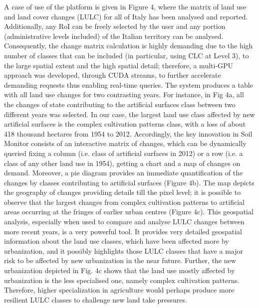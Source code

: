 \documentclass[APA,LATO1COL,doublespace]{WileyNJD-v2}
\begin{document}
A case of use of the platform is given in Figure 4, where the matrix of land use and land cover changes (LULC) for all of Italy has been analysed and reported. Additionally, any RoI can be freely selected by the user and any portion (administrative levels included) of the Italian territory can be analysed. Consequently, the change matrix calculation is highly demanding due to the high number of classes that can be included (in particular, using CLC at Level 3), to the large spatial extent and the high spatial detail; therefore, a multi-GPU approach was developed, through CUDA streams, to further accelerate demanding requests thus enabling real-time queries. The system produces a table with all land use changes for two contrasting years. For instance, in Fig 4a, all the changes of state contributing to the artificial surfaces class between two different years was selected. In our case, the largest land use class affected by new artificial surfaces is the complex cultivation patterns class, with a loss of about 418 thousand hectares from 1954 to 2012. Accordingly, the key innovation in Soil Monitor consists of an interactive matrix of changes, which can be dynamically queried fixing a column (i.e. class of artificial surfaces in 2012) or a row (i.e. a class of any other land use in 1954), getting a chart and a map of changes on demand. Moreover, a pie diagram provides an immediate quantification of the changes by classes contributing to artificial surfaces (Figure 4b). The map depicts the geography of changes providing details till the pixel level; it is possible to observe that the largest changes from complex cultivation patterns to artificial areas occurring at the fringes of earlier urban centres (Figure 4c). This geospatial analysis, especially when used to compare and analyse LULC changes between more recent years, is a very powerful tool. It provides very detailed geospatial information about the land use classes, which have been affected more by urbanization, and it possibly highlights those LULC classes that have a major risk to be affected by new urbanization in the near future. Further, the new urbanization depicted in Fig. 4c shows that the land use mostly affected by urbanization is the less specialised one, namely complex cultivation patterns. Therefore, higher specialization in agriculture would perhaps produce more resilient LULC classes to challenge new land take pressures.
\end{document}
